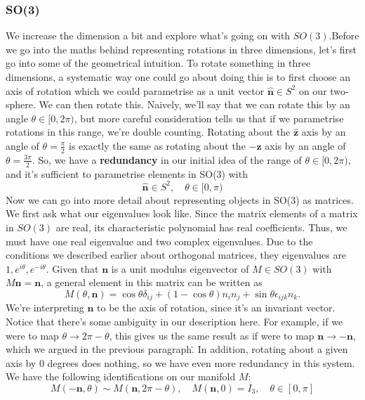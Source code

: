 \documentclass[11pt, oneside]{article}   	%
\theoremstyle{slanted}
\begin{document}
\subsubsection{SO(3)}
We increase the dimension a bit and explore what's going on with $SO(3)$.Before we go into the maths behind representing rotations in three dimensions, let's first go into some of the geometrical intuition. To rotate something in three dimensions, a systematic way one could go about doing this is to first choose an axis of rotation which we could parametrise as a unit vector $\hat{\mathbf{n}} \in S^2 $ on our two-sphere. We can then rotate this. Naively, we'll say that we can rotate this by an angle $\theta \in [0, 2\pi)$, but more careful consideration tells us that if we parametrise rotations in this range, we're double counting. Rotating about the $\hat{ \mathbf{z} } $ axis by an angle of $ \theta  = \frac{ \pi }{ 2 } $ is exactly the same as rotating about the $ - \hat{ \mathbf { z} } $ axis by an angle of $ \theta  = \frac{ 3 \pi}{ 2} $. So, we have a \textbf{redundancy} in our initial idea of the range of $\theta \in [0, 2 \pi)$, and it's sufficient to parametrise elements in SO(3) with 
\[ 
	\hat{ \mathbf{ n } } \in S^2, \quad \theta \in [0 , \pi ) 
\] Now we can go into more detail about representing objects in SO(3) as matrices.  We first ask what our eigenvalues look like. Since the matrix elements of a matrix in $SO(3)$ are real, its characteristic polynomial has real coefficients. Thus, we must have one real eigenvalue and two complex eigenvalues. Due to the conditions we described earlier about orthogonal matrices, they eigenvalues are $1, e^{i \theta}, e^{ - i \theta}$. 
Given that $\mathbf{n}$ is a unit modulus eigenvector of $M \in SO(3)$ with $M \mathbf{n} = \mathbf{n}$, a general element in this matrix can be written as 
\[
	M(\theta, \mathbf{n}) = \cos \theta \delta_{ij} + (1 - \cos \theta) n_i n _j  + \sin \theta \epsilon_{ijk} n_k. 
\]
We're interpreting $\mathbf{n}$ to be the axis of rotation, since it's an invariant vector. Notice that there's some ambiguity in our description here. For example, if we were to map $\theta \rightarrow 2 \pi - \theta$, this gives us the same result as if were to map $\mathbf{n} \rightarrow - \mathbf{n}$, which we argued in the previous paragraph\. . In addition, rotating about a given axis by 0 degrees does nothing, so we have even more redundancy in this system. We have the following identifications on our manifold $M$: 
\[ 
	M( - \mathbf{n}, \theta ) \sim M ( \mathbf{n}, 2\pi - \theta), \quad M(\mathbf{n}, 0 )  = I_3, \quad \theta \in [ 0, \pi] 
\] 
\end{document}
